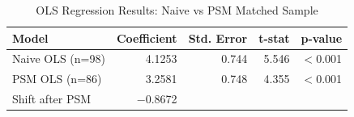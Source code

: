 \documentclass[12pt]{article}
\begin{document}
\begin{table}[H]
    \centering
    \caption{OLS Regression Results: Naive vs PSM Matched Sample}
    \begin{tabular}{lrrrr}
        \toprule
        \textbf{Model} & \textbf{Coefficient} & \textbf{Std. Error} & \textbf{t-stat} & \textbf{p-value} \\
        \midrule
        Naive OLS (n=98) & 4.1253 & 0.744 & 5.546 & $<$0.001 \\
        PSM OLS (n=86)   & 3.2581 & 0.748 & 4.355 & $<$0.001 \\
        \midrule
        Shift after PSM  & $-$0.8672 & & & \\
        \bottomrule
    \end{tabular}
    \label{tab:regression}
\end{table}
\end{document}
